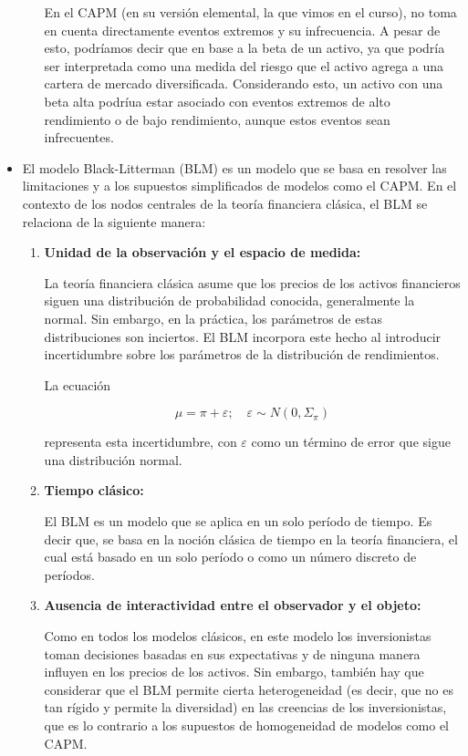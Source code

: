 \begin{problema}
\begin{sol}
\begin{itemize}
\begin{enumerate}
        En el CAPM (en su versión elemental, la que vimos en el curso), no toma en cuenta directamente eventos extremos y su infrecuencia.\bigbreak 
        A pesar de esto, podríamos decir que en base a la beta de un activo, ya que podría ser interpretada como una medida del riesgo que el activo agrega a una cartera de mercado diversificada. Considerando esto, un activo con una beta alta podríua estar asociado con eventos extremos de alto rendimiento o de bajo rendimiento, aunque estos eventos sean infrecuentes.
        \end{enumerate}
        \item El modelo Black-Litterman (BLM) es un modelo que se basa en resolver las limitaciones y a los supuestos simplificados de modelos como el CAPM. En el contexto de los nodos centrales de la teoría financiera clásica, el BLM se relaciona de la siguiente manera:

        \begin{enumerate}
        \item \textbf{Unidad de la observación y el espacio de medida:}
        
        La teoría financiera clásica asume que los precios de los activos financieros siguen una distribución de probabilidad conocida, generalmente la normal. Sin embargo, en la práctica, los parámetros de estas distribuciones son inciertos. El BLM incorpora este hecho al introducir incertidumbre sobre los parámetros de la distribución de rendimientos. 
        
        La ecuación
        
        $$
        \mu = \pi + \varepsilon ;\quad \varepsilon \sim N\left(0, \Sigma_{\pi}\right)
        $$
        
        representa esta incertidumbre, con $\varepsilon$ como un término de error que sigue una distribución normal.
        
        \item \textbf{Tiempo clásico:}
        
        El BLM es un modelo que se aplica en un solo período de tiempo. Es decir que, se basa en la noción clásica de tiempo en la teoría financiera, el cual está basado en un solo período o como un número discreto de períodos.
        
        \item \textbf{Ausencia de interactividad entre el observador y el objeto:}
        
        Como en todos los modelos clásicos, en este modelo los inversionistas toman decisiones basadas en sus expectativas y de ninguna manera influyen en los precios de los activos. Sin embargo, también hay que considerar que el BLM permite cierta heterogeneidad (es decir, que no es tan rígido y permite la diversidad) en las creencias de los inversionistas, que es lo contrario a los supuestos de homogeneidad de modelos como el CAPM.
        

\end{enumerate}
\end{itemize}
\end{sol}
\end{problema}

